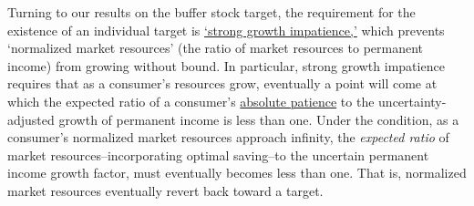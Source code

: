 \documentclass[BufferStockTheory]{subfiles}
\begin{document}





%

Turning to our results on the buffer stock target, the requirement for the existence of an individual target is \hyperlink{GIC-Mod}{`strong growth impatience,'} which prevents `normalized market resources' (the ratio of market resources to permanent income) from growing without bound. In particular, strong growth impatience requires that as a consumer's resources grow, eventually a point will come at which the expected ratio of a consumer's \hyperlink{APFacDefn}{absolute patience} to the uncertainty-adjusted growth of permanent income is less than one. Under the condition, as a consumer's normalized market resources approach infinity, the \textit{expected ratio} of market resources--incorporating optimal saving--to the uncertain permanent income growth factor, must eventually becomes less than one. That is, normalized market resources eventually revert back toward a target.
\end{document}
